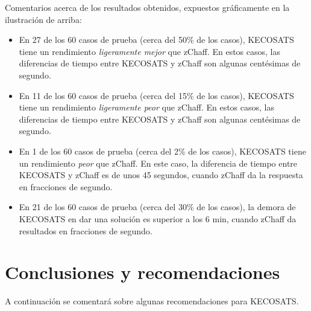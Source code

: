 \documentclass[12pt,lettersize,oneside]{article}
\begin{document}
Comentarios acerca de los resultados obtenidos, expuestos gráficamente en la ilustración de arriba:\vspace{-2.5mm}
\begin{itemize}
\item En 27 de los 60 casos de prueba (cerca del 50\% de los casos), KECOSATS
  tiene un rendimiento \emph{ligeramente mejor} que zChaff. En estos casos, las
  diferencias de tiempo entre KECOSATS y zChaff son algunas centésimas de
  segundo.
\item En 11 de los 60 casos de prueba (cerca del 15\% de los casos), KECOSATS
  tiene un rendimiento \emph{ligeramente peor} que zChaff. En estos casos, las
  diferencias de tiempo entre KECOSATS y zChaff son algunas centésimas de
  segundo.
\item En 1 de los 60 casos de prueba (cerca del 2\% de los casos), KECOSATS
  tiene un rendimiento \emph{peor} que zChaff. En este caso, la diferencia de
  tiempo entre KECOSATS y zChaff es de unos 45 segundos, cuando zChaff da la
  respuesta en fracciones de segundo.
\item En 21 de los 60 casos de prueba (cerca del 30\% de los casos), la demora
  de KECOSATS en dar una solución es superior a los 6 min, cuando zChaff da
  resultados en fracciones de segundo.
\end{itemize}

\section{Conclusiones y recomendaciones}

A continuación se comentará sobre algunas recomendaciones para KECOSATS.
\end{document}
